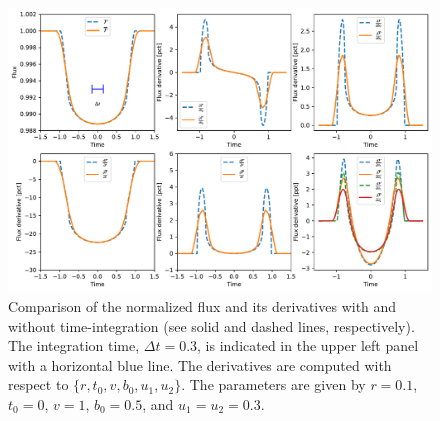 \documentclass[modern,trackchanges]{aastex63}
\newcommand{\edited}{}
\begin{document}
\begin{figure}
    \begin{centering}
    \includegraphics[width=\linewidth]{figures/julia/integrate_transit_gradient.pdf}
    \caption{Comparison of the normalized flux and its derivatives with {\edited and
    without time-integration (see solid and dashed lines, respectively)}.  
    The integration time, $\Delta t = 0.3$, is indicated in the
    upper left panel with a horizontal blue line. The derivatives are computed with
    respect to $\{r,t_0,v,b_0,u_1,u_2\}$.  The parameters are given by $r=0.1$,
    $t_0 = 0$, {\edited $v=1$}, $b_0=0.5$, and $u_1=u_2=0.3$. 
    \label{fig:integrated_derivs}}
    \end{centering}
\end{figure}
\end{document}
